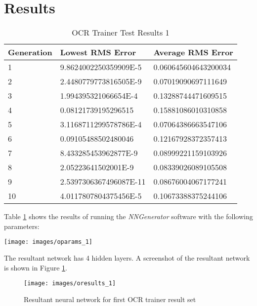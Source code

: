 \section{Results}  

\begin{center}
    \begin{longtable}{ | l | l | l |}
      \caption{OCR Trainer Test Results 1} \label{ocr1} \\
    \hline
  Generation & Lowest RMS Error & Average RMS Error \\ \hline
1 &	9.8624002250359909E-5 &	0.060645604643200034 \\ \hline
2 &	2.4480779773816505E-9 &	0.07019090697111649 \\ \hline
3 &	1.994395321066654E-4 &	0.13288744471609515 \\ \hline
4 &	0.08121739195296515 &	0.15881086010310858 \\ \hline
5 &	3.1168711299578786E-4	& 0.07064386663547106 \\ \hline
6 &	0.09105488502480046 &	0.12167928372357413 \\ \hline
7 &	8.433285453962877E-9 &	0.08999221159103926 \\ \hline
8 &	2.05223641502001E-9 &	0.08339026089105508 \\ \hline
9 &	2.5397306367496087E-11 &	0.08676004067177241 \\ \hline
10 & 4.0117807804375456E-5 &	0.10673388375244106 \\ \hline
\end{longtable}
\end{center}

Table \ref{ocr1} shows the results of running the {\it NNGenerator} software with the following parameters:

\begin{center}
\texttt{[image: images/oparams\_1]}
\end{center}

The resultant network has 4 hidden layers.
A screenshot of the resultant network is shown in Figure \ref{oresults_1}.

\begin{figure}[h!]
  \centering
  \texttt{[image: images/oresults\_1]}
  \caption{Resultant neural network for first OCR trainer result set}
  \label{oresults_1}
\end{figure}

